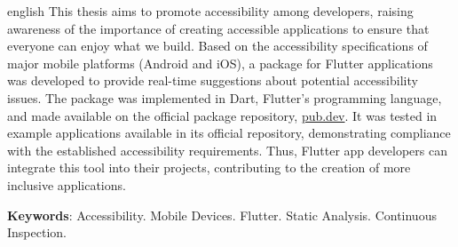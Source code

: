 
\begin{resumo}[Abstract]
 \begin{otherlanguage*}{english}
  This thesis aims to promote accessibility among developers, raising awareness of the importance of creating accessible applications to ensure that everyone can enjoy what we build. Based on the accessibility specifications of major mobile platforms (Android and iOS), a package for Flutter applications was developed to provide real-time suggestions about potential accessibility issues. The package was implemented in Dart, Flutter’s programming language, and made available on the official package repository, \href{https://pub.dev}{pub.dev}. It was tested in example applications available in its official repository, demonstrating compliance with the established accessibility requirements. Thus, Flutter app developers can integrate this tool into their projects, contributing to the creation of more inclusive applications.

  \textbf{Keywords}: Accessibility. Mobile Devices. Flutter. Static Analysis. Continuous Inspection.
  \end{otherlanguage*}
\end{resumo}
